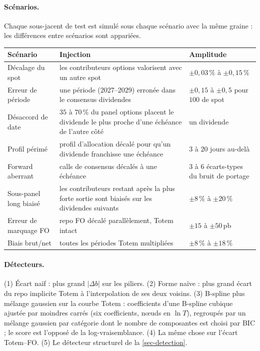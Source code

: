 \paragraph{Scénarios.} Chaque sous-jacent de test est simulé sous chaque scénario avec la même graine : les différences
entre scénarios sont appariées.
\begin{center}\small
\begin{tabular}{p{4.0cm}p{7.4cm}p{3.2cm}}
\toprule
Scénario & Injection & Amplitude\\
\midrule
Décalage du spot & les contributeurs options valorisent avec un autre spot & $\pm0{,}03\,\%$ à $\pm0{,}15\,\%$\\
Erreur de période & une période (2027--2029) erronée dans le consensus dividendes & $\pm0{,}15$ à $\pm0{,}5$ pour $100$ de spot\\
Désaccord de date & $35$ à $70\,\%$ du panel options placent le dividende le plus proche d'une échéance de l'autre côté & un dividende\\
Profil périmé & profil d'allocation décalé pour qu'un dividende franchisse une échéance & $3$ à $20$ jours au-delà\\
Forward aberrant & calls de consensus décalés à une échéance & $3$ à $6$ écarts-types du bruit de portage\\
Sous-panel long biaisé & les contributeurs restant après la plus forte sortie sont biaisés sur les dividendes suivants & $\pm8\,\%$ à $\pm20\,\%$\\
Erreur de marquage FO & repo FO décalé parallèlement, Totem intact & $\pm15$ à $\pm50$\,pb\\
Biais brut/net & toutes les périodes Totem multipliées & $\pm8\,\%$ à $\pm18\,\%$\\
\bottomrule
\end{tabular}
\end{center}

\paragraph{Détecteurs.} (1) Écart naïf : plus grand $|\Delta b|$ sur les piliers. (2) Forme naïve : plus grand écart du
repo implicite Totem à l'interpolation de ses deux voisins. (3) B-spline plus mélange gaussien sur la courbe Totem :
coefficients d'une B-spline cubique ajustée par moindres carrés (six coefficients, nœuds en $\ln T$), regroupés par un
mélange gaussien par catégorie dont le nombre de composantes est choisi par BIC ; le score est l'opposé de la
log-vraisemblance. (4) La même chose sur l'écart Totem--FO. (5) Le détecteur structurel de la \cref{sec-detection}.

